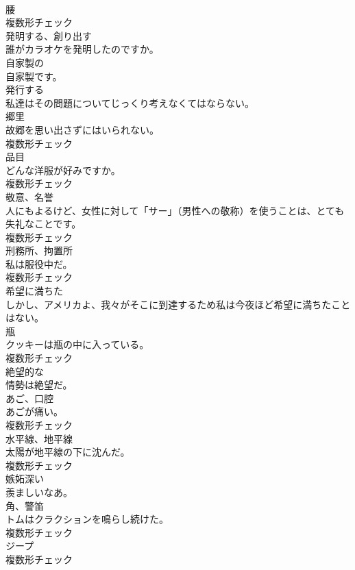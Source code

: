 \documentclass[8pt]{extreport}
\begin{document}
\begin{CJK}{UTF8}{min}
\\	[名詞]	腰	
\\	複数形チェック
\\	[動詞]	発明する、創り出す	
\\	誰がカラオケを発明したのですか。	
\\	[形容詞]	自家製の	
\\	自家製です。	
\\	[動詞]	発行する	
\\	私達はその問題についてじっくり考えなくてはならない。	
\\	[名詞]	郷里	
\\	故郷を思い出さずにはいられない。	
\\	複数形チェック
\\	[名詞]	品目	
\\	どんな洋服が好みですか。	
\\	複数形チェック
\\	[名詞]	敬意、名誉	
\\	人にもよるけど、女性に対して「サー」（男性への敬称）を使うことは、とても失礼なことです。	
\\	複数形チェック
\\	[名詞]	刑務所、拘置所	
\\	私は服役中だ。	
\\	複数形チェック
\\	[形容詞]	希望に満ちた	
\\	しかし、アメリカよ、我々がそこに到達するため私は今夜ほど希望に満ちたことはない。	
\\	[名詞]	瓶	
\\	クッキーは瓶の中に入っている。	
\\	複数形チェック
\\	[形容詞]	絶望的な	
\\	情勢は絶望だ。	
\\	[名詞]	あご、口腔	
\\	あごが痛い。	
\\	複数形チェック
\\	[名詞]	水平線、地平線	
\\	太陽が地平線の下に沈んだ。	
\\	複数形チェック
\\	[形容詞]	嫉妬深い	
\\	羨ましいなあ。	
\\	[名詞]	角、警笛	
\\	トムはクラクションを鳴らし続けた。	
\\	複数形チェック
\\	[名詞]	ジープ	
\\	複数形チェック

\end{CJK}
\end{document}
